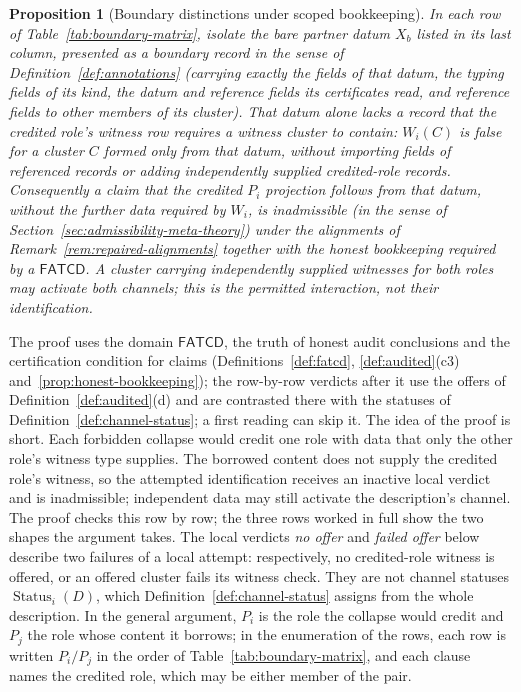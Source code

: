 \documentclass[11pt]{article}
\newtheorem{proposition}[theorem]{Proposition}
\theoremstyle{definition}
\newcommand{\FATCD}{\ensuremath{\mathsf{FATCD}}}
\newcommand{\Status}[2]{\ensuremath{\operatorname{Status}_{#1}\!\left(#2\right)}}
\begin{document}
\begin{proposition}[Boundary distinctions under scoped bookkeeping]\label{prop:boundary-distinctions}
In each row of Table~\ref{tab:boundary-matrix}, isolate the bare partner
datum \(X_b\) listed in its last column, presented as a boundary record in
the sense of Definition~\ref{def:annotations} (carrying exactly the fields of that
datum, the typing fields of its kind, the datum and reference fields its certificates read, and reference fields to other members of its cluster). That datum alone lacks a record that the credited role's witness row requires a witness cluster to contain: \(W_i(C)\) is false for a cluster \(C\) formed only from that
datum, without importing fields of referenced records or adding
independently supplied credited-role records. Consequently a claim that the credited \(P_i\)
projection follows from that datum, without the further data required by
\(W_i\), is inadmissible (in the sense of Section~\ref{sec:admissibility-meta-theory}) under the alignments of
Remark~\ref{rem:repaired-alignments} together with the honest bookkeeping
required by a \FATCD{}. A cluster carrying independently supplied witnesses
for both roles may activate both channels; this is the permitted interaction,
not their identification.
\end{proposition}

The proof uses the domain \FATCD{}, the truth of honest audit conclusions and the certification condition for claims (Definitions~\ref{def:fatcd}, \ref{def:audited}(c3) and~\ref{prop:honest-bookkeeping}); the row-by-row verdicts after it use the offers of Definition~\ref{def:audited}(d) and are contrasted there with the statuses of Definition~\ref{def:channel-status}; a first reading can skip it. The idea of
the proof is short. Each forbidden collapse would credit one
role with data that only the other role's witness type supplies. The
borrowed content does not supply the credited role's witness, so the
attempted identification receives an inactive local verdict and is
inadmissible; independent data may still activate the description's
channel. The proof checks this
row by row; the three rows worked in full show the two shapes the
argument takes. The local verdicts \emph{no offer} and \emph{failed offer} below describe
two failures of a local attempt: respectively, no credited-role witness is
offered, or an offered cluster fails its witness check. They are not channel
statuses \(\Status{i}{D}\), which Definition~\ref{def:channel-status} assigns
from the whole description. In the general argument, \(P_i\) is the role the collapse
would credit and \(P_j\) the role whose content it borrows; in the
enumeration of the rows, each row is written \(P_i/P_j\) in the order of
Table~\ref{tab:boundary-matrix}, and each clause names the credited role,
which may be either member of the pair.
\end{document}
